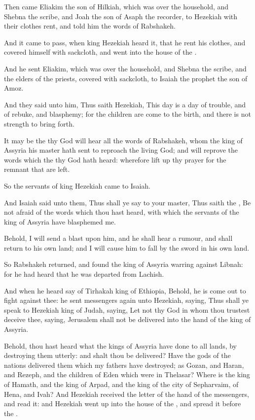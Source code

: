 \Verse Then came Eliakim the son of Hilkiah, which was over the household, and Shebna the scribe, and Joah the son of Asaph the recorder, to Hezekiah with their clothes rent, and told him the words of Rabshakeh.


\Chapter
\Verse And it came to pass, when king Hezekiah heard it, that he rent his clothes, and covered himself with sackcloth, and went into the house of the \LORD.

\Verse And he sent Eliakim, which was over the household, and Shebna the scribe, and the elders of the priests, covered with sackcloth, to Isaiah the prophet the son of Amoz.

\Verse And they said unto him, Thus saith Hezekiah, This day is a day of trouble, and of rebuke, and blasphemy; for the children are come to the birth, and there is not strength to bring forth.

\Verse It may be the \LORD thy God will hear all the words of Rabshakeh, whom the king of Assyria his master hath sent to reproach the living God; and will reprove the words which the \LORD thy God hath heard: wherefore lift up thy prayer for the remnant that are left.

\Verse So the servants of king Hezekiah came to Isaiah.

\Verse And Isaiah said unto them, Thus shall ye say to your master, Thus saith the \LORD, Be not afraid of the words which thou hast heard, with which the servants of the king of Assyria have blasphemed me.

\Verse Behold, I will send a blast upon him, and he shall hear a rumour, and shall return to his own land; and I will cause him to fall by the sword in his own land.

\Verse So Rabshakeh returned, and found the king of Assyria warring against Libnah: for he had heard that he was departed from Lachish.

\Verse And when he heard say of Tirhakah king of Ethiopia, Behold, he is come out to fight against thee: he sent messengers again unto Hezekiah, saying, \Verse Thus shall ye speak to Hezekiah king of Judah, saying, Let not thy God in whom thou trustest deceive thee, saying, Jerusalem shall not be delivered into the hand of the king of Assyria.

\Verse Behold, thou hast heard what the kings of Assyria have done to all lands, by destroying them utterly: and shalt thou be delivered?  \Verse Have the gods of the nations delivered them which my fathers have destroyed; as Gozan, and Haran, and Rezeph, and the children of Eden which were in Thelasar?  \Verse Where is the king of Hamath, and the king of Arpad, and the king of the city of Sepharvaim, of Hena, and Ivah?  \Verse And Hezekiah received the letter of the hand of the messengers, and read it: and Hezekiah went up into the house of the \LORD, and spread it before the \LORD.

